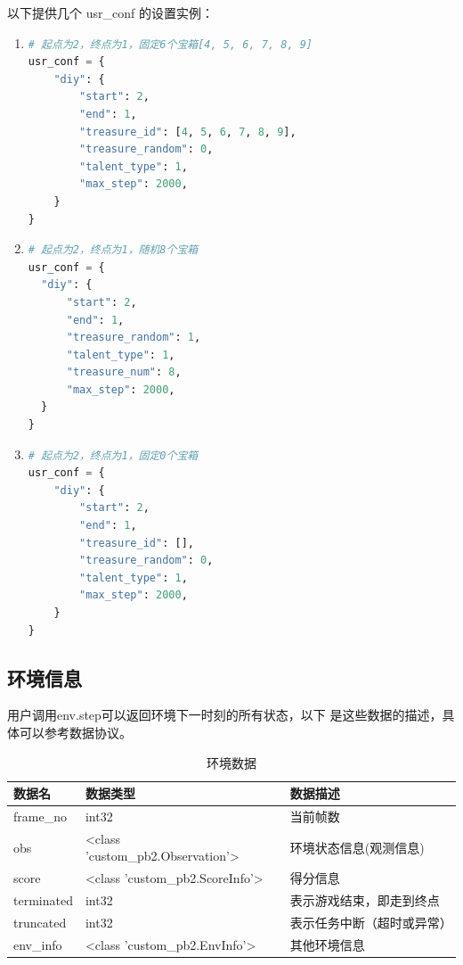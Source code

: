 以下提供几个 usr\_conf 的设置实例：


\begin{enumerate}[label=例子\arabic*]
    \item 
\begin{lstlisting}[language=Python]
# 起点为2，终点为1，固定6个宝箱[4, 5, 6, 7, 8, 9]
usr_conf = {
    "diy": {
        "start": 2,
        "end": 1,
        "treasure_id": [4, 5, 6, 7, 8, 9],
        "treasure_random": 0,
        "talent_type": 1,
        "max_step": 2000,
    }
}
\end{lstlisting}

    \item 

\begin{lstlisting}[language=Python]
# 起点为2，终点为1，随机8个宝箱
usr_conf = {
  "diy": {
      "start": 2,
      "end": 1,
      "treasure_random": 1,
      "talent_type": 1,
      "treasure_num": 8,
      "max_step": 2000,
  }
}
\end{lstlisting}

    \item 

\begin{lstlisting}[language=Python]
# 起点为2，终点为1，固定0个宝箱
usr_conf = {
    "diy": {
        "start": 2,
        "end": 1,
        "treasure_id": [],
        "treasure_random": 0,
        "talent_type": 1,
        "max_step": 2000,
    }
}
\end{lstlisting}

\end{enumerate}

\subsection{环境信息}

用户调用env.step可以返回环境下一时刻的所有状态，以下  是这些数据的描述，具体可以参考数据协议。


\begin{table}[H]
    \begin{tabularx}{1\textwidth}{l l X } %
        \hline %
        \textbf{数据名} & \textbf{数据类型} & \textbf{数据描述}  \\
        \hline
        frame\_no & int32 & 当前帧数 \\
        obs & <class 'custom\_pb2.Observation'> & 环境状态信息(观测信息) \\
        score & <class 'custom\_pb2.ScoreInfo'> & 得分信息 \\
        terminated & int32 & 表示游戏结束，即走到终点 \\
        truncated & int32 & 表示任务中断（超时或异常） \\
        env\_info & <class 'custom\_pb2.EnvInfo'> & 其他环境信息 \\
        \hline
    \end{tabularx}

    \centering
    \caption{环境数据}
    \label{environment-data}
\end{table}


